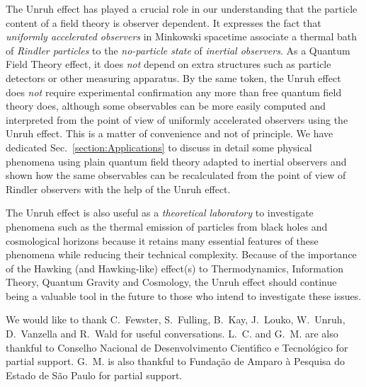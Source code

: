 \documentclass[12pt,nofootinbib,floatfix,aps,prd,showpacs,amsmath,amssymb,eqsecnum]{revtex4-2}
\begin{document}
The Unruh effect has played a crucial role in our 
understanding that the particle content of a field 
theory is observer dependent. It expresses the fact that 
{\em uniformly accelerated observers} in Minkowski 
spacetime associate a thermal bath of {\em Rindler 
particles} to the {\em no-particle state} of {\em inertial 
observers}. As a Quantum Field Theory effect, it does {\em not} 
depend on extra structures such as particle detectors 
or other measuring apparatus.
By the same token, the Unruh effect does {\em not} require 
experimental confirmation any more than free quantum 
field theory does, although some observables can be more 
easily computed and interpreted from the point of view 
of uniformly accelerated observers using the Unruh effect.
This is a matter of convenience and not
of principle. We have dedicated Sec.~\ref{section:Applications}
to discuss in detail some physical phenomena using plain 
quantum field theory adapted to inertial observers and  
shown how the same observables can be recalculated 
from the point of view of Rindler observers with the help 
of the Unruh effect.

The Unruh effect is also useful as a {\em theoretical laboratory} 
to investigate phenomena such 
as the thermal emission of particles from 
black holes and cosmological horizons because it retains many essential 
features of these phenomena while reducing their technical 
complexity. Because of the importance of the Hawking (and Hawking-like) 
effect(s) to Thermodynamics, Information Theory, Quantum Gravity and 
Cosmology, the Unruh effect should continue being a valuable tool 
in the future to those who intend to investigate these issues.


\begin{acknowledgments}

We would like 
to thank C.~Fewster, S.~Fulling, B.~Kay, J.~Louko, W.~Unruh, 
D.~Vanzella and R.~Wald 
for useful conversations. L.~C. and G.~M. are also thankful to Conselho 
Nacional de Desenvolvimento Cient\'\i fico e Tecnol\'ogico for partial 
support. G.~M. is also thankful to Funda\c c\~ao de Amparo \`a Pesquisa do 
Estado de S\~ao Paulo for partial support.

\end{acknowledgments} 

\appendix

\end{document}
